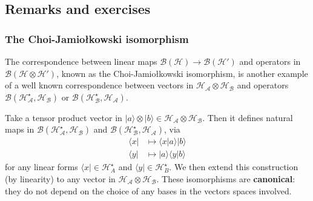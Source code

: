 \documentclass[fleqn]{article}
\begin{document}
\hypertarget{remarks-and-exercises-3}{%
\subsection{Remarks and exercises}\label{remarks-and-exercises-3}}

\hypertarget{the-choi-jamioux142kowski-isomorphism}{%
\subsubsection{The Choi-Jamiołkowski isomorphism}\label{the-choi-jamioux142kowski-isomorphism}}

The correspondence between linear maps \(\mathscr{B}(\mathcal{H})\to\mathscr{B}(\mathcal{H'})\) and operators in \(\mathscr{B}(\mathcal{H}\otimes\mathcal{H'})\), known as the Choi-Jamiołkowski isomorphism, is another example of a well known correspondence between vectors in \(\mathcal{H}_{\mathcal{A}}\otimes\mathcal{H}_{\mathcal{B}}\) and operators \(\mathscr{B}(\mathcal{H}_{\mathcal{A}}^\star,\mathcal{H}_{\mathcal{B}})\) or \(\mathscr{B}(\mathcal{H}_{\mathcal{B}}^\star,\mathcal{H}_{\mathcal{A}})\).

Take a tensor product vector in \(|a\rangle\otimes|b\rangle\in \mathcal{H}_{\mathcal{A}}\otimes\mathcal{H}_{\mathcal{B}}\).
Then it defines natural maps in \(\mathscr{B}(\mathcal{H}_{\mathcal{A}}^\star,\mathcal{H}_{\mathcal{B}})\) and \(\mathscr{B}(\mathcal{H}_{\mathcal{B}}^\star,\mathcal{H}_{\mathcal{A}})\), via
\[
  \begin{aligned}
    \langle x|
    &\longmapsto \langle x|a\rangle|b\rangle
  \\\langle y|
    &\longmapsto |a\rangle\langle y|b\rangle
  \end{aligned}
\]
for any linear forms \(\langle x|\in\mathcal{H}^\star_A\) and \(\langle y|\in\mathcal{H}^\star_B\).
We then extend this construction (by linearity) to any vector in \(\mathcal{H}_{\mathcal{A}}\otimes\mathcal{H}_{\mathcal{B}}\).
These isomorphisms are \textbf{canonical}: they do not depend on the choice of any bases in the vectors spaces involved.
\end{document}

